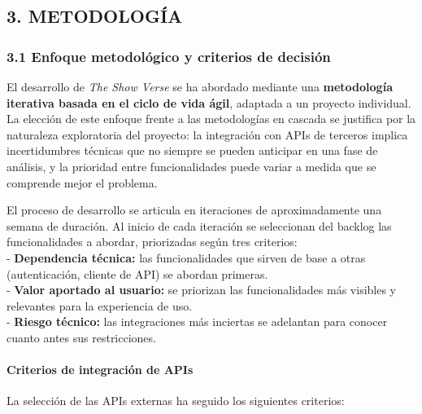 \documentclass[
]{article}
\author{}
\date{}
\begin{document}
\hypertarget{metodologuxeda}{%
\subsection{3. METODOLOGÍA}\label{metodologuxeda}}

\hypertarget{enfoque-metodoluxf3gico-y-criterios-de-decisiuxf3n}{%
\subsubsection{3.1 Enfoque metodológico y criterios de
decisión}\label{enfoque-metodoluxf3gico-y-criterios-de-decisiuxf3n}}

El desarrollo de \emph{The Show Verse} se ha abordado mediante una
\textbf{metodología iterativa basada en el ciclo de vida ágil}, adaptada
a un proyecto individual. La elección de este enfoque frente a las
metodologías en cascada se justifica por la naturaleza exploratoria del
proyecto: la integración con APIs de terceros implica incertidumbres
técnicas que no siempre se pueden anticipar en una fase de análisis, y
la prioridad entre funcionalidades puede variar a medida que se
comprende mejor el problema.

El proceso de desarrollo se articula en iteraciones de aproximadamente
una semana de duración. Al inicio de cada iteración se seleccionan del
backlog las funcionalidades a abordar, priorizadas según tres
criterios:\\
- \textbf{Dependencia técnica:} las funcionalidades que sirven de base a
otras (autenticación, cliente de API) se abordan primeras.\\
- \textbf{Valor aportado al usuario:} se priorizan las funcionalidades
más visibles y relevantes para la experiencia de uso.\\
- \textbf{Riesgo técnico:} las integraciones más inciertas se adelantan
para conocer cuanto antes sus restricciones.

\hypertarget{criterios-de-integraciuxf3n-de-apis}{%
\paragraph{Criterios de integración de
APIs}\label{criterios-de-integraciuxf3n-de-apis}}

La selección de las APIs externas ha seguido los siguientes criterios:
\end{document}

